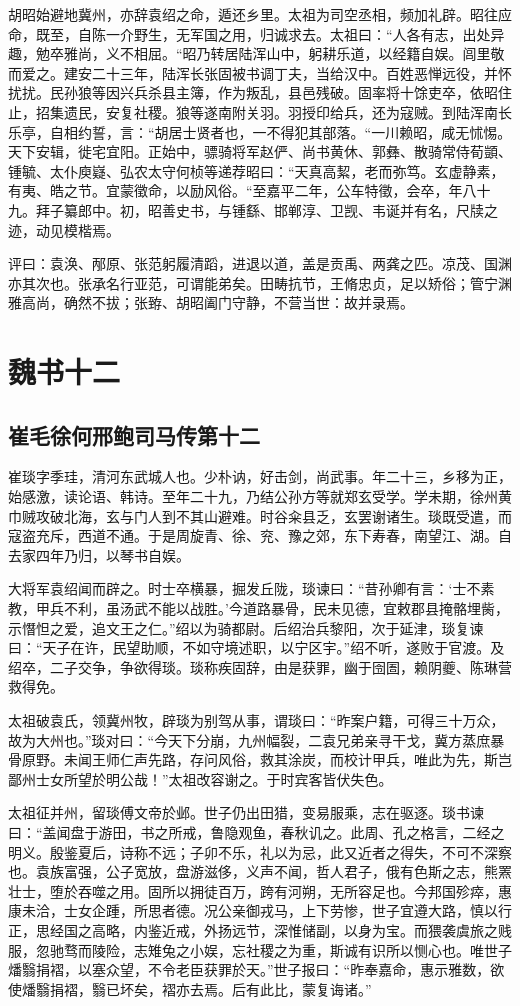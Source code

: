\documentclass[12pt,UTF8]{ctexbook}
\begin{document}
胡昭始避地冀州，亦辞袁绍之命，遁还乡里。太祖为司空丞相，频加礼辟。昭往应命，既至，自陈一介野生，无军国之用，归诚求去。太祖曰：“人各有志，出处异趣，勉卒雅尚，义不相屈。“昭乃转居陆浑山中，躬耕乐道，以经籍自娱。闾里敬而爱之。建安二十三年，陆浑长张固被书调丁夫，当给汉中。百姓恶惮远役，并怀扰扰。民孙狼等因兴兵杀县主簿，作为叛乱，县邑残破。固率将十馀吏卒，依昭住止，招集遗民，安复社稷。狼等遂南附关羽。羽授印给兵，还为寇贼。到陆浑南长乐亭，自相约誓，言：“胡居士贤者也，一不得犯其部落。“一川赖昭，咸无怵惕。天下安辑，徙宅宜阳。正始中，骠骑将军赵俨、尚书黄休、郭彝、散骑常侍荀顗、锺毓、太仆庾嶷、弘农太守何桢等递荐昭曰：“天真高絜，老而弥笃。玄虚静素，有夷、皓之节。宜蒙徵命，以励风俗。“至嘉平二年，公车特徵，会卒，年八十九。拜子纂郎中。初，昭善史书，与锺繇、邯郸淳、卫觊、韦诞并有名，尺牍之迹，动见模楷焉。

评曰：袁涣、邴原、张范躬履清蹈，进退以道，盖是贡禹、两龚之匹。凉茂、国渊亦其次也。张承名行亚范，可谓能弟矣。田畴抗节，王脩忠贞，足以矫俗；管宁渊雅高尚，确然不拔；张臶、胡昭阖门守静，不营当世：故并录焉。

\part{魏书十二}
\chapter{崔毛徐何邢鲍司马传第十二}

崔琰字季珪，清河东武城人也。少朴讷，好击剑，尚武事。年二十三，乡移为正，始感激，读论语、韩诗。至年二十九，乃结公孙方等就郑玄受学。学未期，徐州黄巾贼攻破北海，玄与门人到不其山避难。时谷籴县乏，玄罢谢诸生。琰既受遣，而寇盗充斥，西道不通。于是周旋青、徐、兖、豫之郊，东下寿春，南望江、湖。自去家四年乃归，以琴书自娱。

大将军袁绍闻而辟之。时士卒横暴，掘发丘陇，琰谏曰：“昔孙卿有言：‘士不素教，甲兵不利，虽汤武不能以战胜。’今道路暴骨，民未见德，宜敕郡县掩骼埋胔，示憯怛之爱，追文王之仁。”绍以为骑都尉。后绍治兵黎阳，次于延津，琰复谏曰：“天子在许，民望助顺，不如守境述职，以宁区宇。”绍不听，遂败于官渡。及绍卒，二子交争，争欲得琰。琰称疾固辞，由是获罪，幽于囹圄，赖阴夔、陈琳营救得免。

太祖破袁氏，领冀州牧，辟琰为别驾从事，谓琰曰：“昨案户籍，可得三十万众，故为大州也。”琰对曰：“今天下分崩，九州幅裂，二袁兄弟亲寻干戈，冀方蒸庶暴骨原野。未闻王师仁声先路，存问风俗，救其涂炭，而校计甲兵，唯此为先，斯岂鄙州士女所望於明公哉！”太祖改容谢之。于时宾客皆伏失色。

太祖征并州，留琰傅文帝於邺。世子仍出田猎，变易服乘，志在驱逐。琰书谏曰：“盖闻盘于游田，书之所戒，鲁隐观鱼，春秋讥之。此周、孔之格言，二经之明义。殷鉴夏后，诗称不远；子卯不乐，礼以为忌，此又近者之得失，不可不深察也。袁族富强，公子宽放，盘游滋侈，义声不闻，哲人君子，俄有色斯之志，熊罴壮士，堕於吞噬之用。固所以拥徒百万，跨有河朔，无所容足也。今邦国殄瘁，惠康未洽，士女企踵，所思者德。况公亲御戎马，上下劳惨，世子宜遵大路，慎以行正，思经国之高略，内鉴近戒，外扬远节，深惟储副，以身为宝。而猥袭虞旅之贱服，忽驰骛而陵险，志雉兔之小娱，忘社稷之为重，斯诚有识所以恻心也。唯世子燔翳捐褶，以塞众望，不令老臣获罪於天。”世子报曰：“昨奉嘉命，惠示雅数，欲使燔翳捐褶，翳已坏矣，褶亦去焉。后有此比，蒙复诲诸。”
\end{document}
